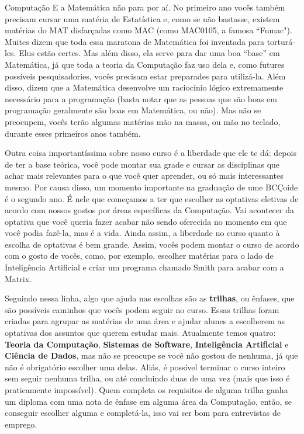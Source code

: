 \begin{subsecao}{Computação}
E a Matemática não para por aí. No primeiro ano vocês também precisam cursar
uma matéria de Estatística e, como se não bastasse, existem matérias do MAT
disfarçadas como MAC (como MAC0105, a famosa ``Fumac"). 
Muites dizem que toda essa maratona de Matemática foi inventada para torturá-les. 
Elus estão certes. Mas além disso, ela serve para dar uma boa ``base'' em Matemática,
já que toda a teoria da Computação faz uso dela e, como futures possíveis
pesquisadories, vocês precisam estar preparades para utilizá-la. Além disso, dizem
que a Matemática desenvolve um raciocínio lógico extremamente necessário para a
programação (basta notar que as pessoas que são boas em programação geralmente
são boas em Matemática, ou não). Mas não se preocupem, vocês terão algumas
matérias mão na massa, ou mão no teclado, durante esses primeiros anos também.

Outra coisa importantíssima sobre nosso curso é a liberdade que ele te dá:
depois de ter a base teórica, você pode montar sua grade e cursar as
disciplinas que achar mais relevantes para o que você quer aprender, ou só
mais interessantes mesmo. Por causa disso, um momento importante na graduação
de ume BCÇoide é o segundo ano. É nele que começamos a ter que escolher as
optativas eletivas de acordo com nossos gostos por áreas específicas da
Computação. Vai acontecer da optativa que você queria fazer acabar não sendo
oferecida no momento em que você podia fazê-la, mas é a vida. Ainda assim, a
liberdade no curso quanto à escolha de optativas é bem grande. Assim, vocês
podem montar o curso de acordo com o gosto de vocês, como, por exemplo, escolher
matérias para o lado de Inteligência Artificial e criar um programa chamado
Smith para acabar com a Matrix.

Seguindo nessa linha, algo que ajuda nas escolhas são as \textbf{trilhas}, ou
ênfases, que são possíveis caminhos que vocês podem seguir no curso. Essas
trilhas foram criadas para agrupar as matérias de uma área e ajudar alunes a
escolherem as optativas dos assuntos que querem estudar mais. Atualmente temos
quatro: \textbf{Teoria da Computação}, \textbf{Sistemas de Software}, 
\textbf{Inteligência Artificial} e \textbf{Ciência de Dados}, mas não se preocupe 
se você não gostou de nenhuma, já que não é obrigatório escolher uma delas. Aliás, é 
possível terminar o curso inteiro sem seguir nenhuma trilha, ou até concluindo duas 
de uma vez (mais que isso é praticamente impossível). Quem completa os requisitos 
de alguma trilha ganha um diploma com uma nota de ênfase em alguma área da Computação,
então, se conseguir escolher alguma e completá-la, isso vai ser bom para entrevistas
de emprego.


\end{subsecao}
